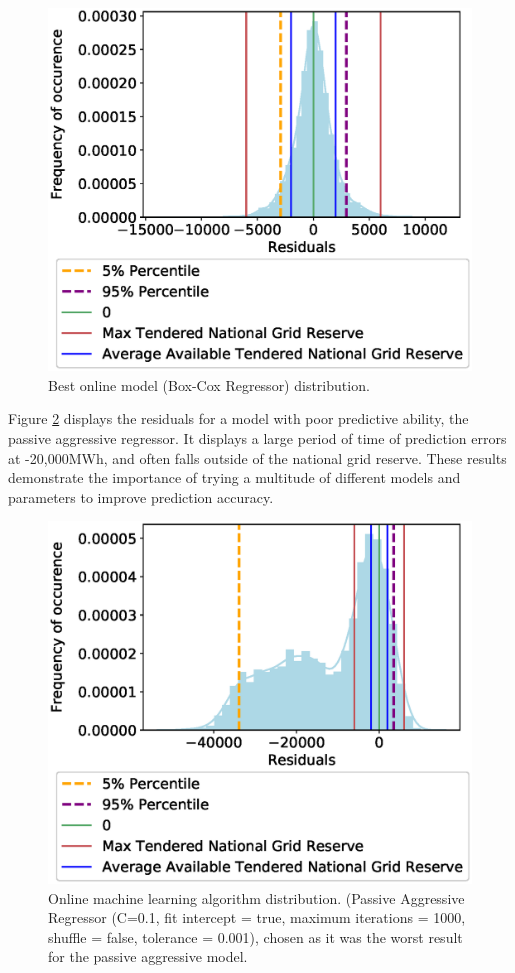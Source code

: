 \documentclass[final,3p,times,twocolumn,numbers]{elsarticle}
\begin{document}
\begin{figure}[h]
\centering
\includegraphics[width=0.8\columnwidth,natwidth=500,natheight=485]{figures/results/online_learning_dists-power-0.1.eps}
\caption{Best online model (Box-Cox Regressor) distribution.}
\label{fig:best_online_learning_day_distribution}
\end{figure}

Figure \ref{fig:bad_online_learning_day_distribution} displays the residuals for a model with poor predictive ability, the passive aggressive regressor. It displays a large period of time of prediction errors at -20,000MWh, and often falls outside of the national grid reserve. These results demonstrate the importance of trying a multitude of different models and parameters to improve prediction accuracy.

\begin{figure}[h]
\centering
\includegraphics[width=0.8\columnwidth,natwidth=500,natheight=400]{figures/results/online_learning_dists-C-0.1-fit_intercept-true-max_iter-1000-shuffle-false-tol 0.001.eps}
\caption{Online machine learning algorithm distribution. (Passive Aggressive Regressor (C=0.1, fit intercept = true, maximum iterations = 1000, shuffle = false, tolerance = 0.001), chosen as it was the worst result for the passive aggressive model.}
\label{fig:bad_online_learning_day_distribution}
\end{figure}
\end{document}

